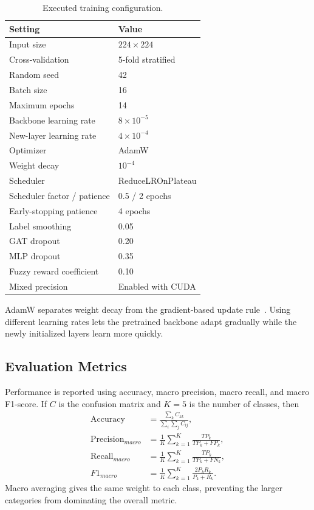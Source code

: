 \documentclass[10pt,conference]{IEEEtran}
\begin{document}
\begin{table}[!t]
\caption{Executed training configuration.}
\label{tab:training}
\centering
\footnotesize
\begin{tabular}{ll}
\toprule
Setting & Value\\
\midrule
Input size & $224\times224$\\
Cross-validation & 5-fold stratified\\
Random seed & 42\\
Batch size & 16\\
Maximum epochs & 14\\
Backbone learning rate & $8\times10^{-5}$\\
New-layer learning rate & $4\times10^{-4}$\\
Optimizer & AdamW\\
Weight decay & $10^{-4}$\\
Scheduler & ReduceLROnPlateau\\
Scheduler factor / patience & 0.5 / 2 epochs\\
Early-stopping patience & 4 epochs\\
Label smoothing & 0.05\\
GAT dropout & 0.20\\
MLP dropout & 0.35\\
Fuzzy reward coefficient & 0.10\\
Mixed precision & Enabled with CUDA\\
\bottomrule
\end{tabular}
\end{table}

AdamW separates weight decay from the gradient-based update rule~\cite{loshchilov2019adamw}. Using different learning rates lets the pretrained backbone adapt gradually while the newly initialized layers learn more quickly.

\subsection{Evaluation Metrics}

Performance is reported using accuracy, macro precision, macro recall, and macro F1-score. If $C$ is the confusion matrix and $K=5$ is the number of classes, then
\begin{align}
\operatorname{Accuracy}&=\frac{\sum_k C_{kk}}{\sum_i\sum_j C_{ij}},\\
\operatorname{Precision}_{macro}&=\frac{1}{K}\sum_{k=1}^{K}\frac{TP_k}{TP_k+FP_k},\\
\operatorname{Recall}_{macro}&=\frac{1}{K}\sum_{k=1}^{K}\frac{TP_k}{TP_k+FN_k},\\
F1_{macro}&=\frac{1}{K}\sum_{k=1}^{K}\frac{2P_kR_k}{P_k+R_k}.
\end{align}
Macro averaging gives the same weight to each class, preventing the larger categories from dominating the overall metric.
\end{document}
